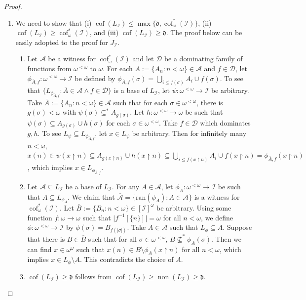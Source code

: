 \documentclass[a4paper,12pt]{amsart}
\theoremstyle{definition}
\numberwithin{thm}{section}
\numberwithin{equation}{section}
\newcommand{\fsq}{\omega^{<\omega}}
\newcommand{\on}{\mathpunct{\upharpoonright}}
\newcommand{\dd}{\mathfrak{d}}
\DeclareMathOperator{\non}{non}
\DeclareMathOperator{\cof}{cof}
\newcommand{\I}{\mathscr{I}}
\renewcommand{\subset}{\subseteq}
\begin{document}
\begin{proof}
\begin{enumerate}
        \item We need to show that (i) $\cof(L_\I)\leq\max\{\dd, \cof^*_\omega(\I)\}$, (ii) $\cof(L_\I)\geq\cof^*_\omega(\I)$, and (iii) $\cof(L_\I)\geq\dd$. The proof below can be easily adopted to the proof for $J_\I$.
        \begin{enumerate}[label = (\roman*)]
            \item Let $\mathcal{A}$ be a witness for $\cof^*_\omega(\I)$ and let $\mathcal{D}$ be a dominating family of functions from $\omega^{<\omega}$ to $\omega$. For each $\overline{A} := \{A_n:n<\omega\}\in\mathcal{A}$ and $f\in\mathcal{D}$, let $\phi_{\overline{A}, f}\colon\omega^{<\omega}\to\I$ be defined by $\phi_{\overline{A}, f}(\sigma) = \bigcup_{i\leq f(\sigma)} A_i\cup f(\sigma)$. To see that $\{L_{\phi_{\overline{A}, f}}: \overline{A}\in\mathcal{A}\land f\in\mathcal{D}\}$ is a base of $L_\I$, let $\psi\colon\fsq\to\I$ be arbitrary. Take $\overline{A} := \{A_n:n<\omega\}\in\mathcal{A}$ such that for each $\sigma\in\fsq$, there is $g(\sigma)<\omega$ with $\psi(\sigma)\subseteq^*A_{g(\sigma)}$. Let $h\colon\fsq\to\omega$ be such that $\psi(\sigma)\subseteq A_{g(\sigma)}\cup h(\sigma)$ for each $\sigma\in\fsq$. Take $f\in\mathcal{D}$ which dominates $g,h$. To see $L_{\psi}\subset L_{\phi_{\overline{A}, f}}$, let $x\in L_\psi$ be arbitrary. Then for infinitely many $n<\omega$, $x(n)\in\psi(x\on n)\subset A_{g(x\on n)}\cup h(x\on n)\subset \bigcup_{i\leq f(x\on n)} A_i\cup f(x\on n)=\phi_{\overline{A}, f}(x\on n)$, which implies $x\in L_{\phi_{\overline{A}, f}}$. 
            \item Let $\mathcal{A} \subset L_\I$ be a base of $L_\I$. For any $A\in\mathcal{A}$, let $\phi_A\colon\omega^{<\omega}\to\I$ be such that $A\subset L_{\phi_A}$. We claim that $\overline{\mathcal{A}} = \{\mathrm{ran}(\phi_A):A\in\mathcal{A}\}$ is a witness for $\cof^*_\omega(\I)$. Let $\overline{B}:=\{B_n:n<\omega\}\in[\I]^\omega$ be arbitrary. Using some function $f\colon\omega\to\omega$ such that $\lvert f^{-1}[\{n\}]\rvert=\omega$ for all $n<\omega$, we define $\phi\colon\omega^{<\omega}\to\I$ by $\phi(\sigma) = B_{f(\lvert\sigma\rvert)}$. Take $A\in\mathcal{A}$ such that $L_{\phi}\subset A$. Suppose that there is $B\in\overline{B}$ such that for all $\sigma\in\omega^{<\omega}$, $B\not\subset^*\phi_A(\sigma)$. Then we can find $x\in\omega^\omega$ such that $x(n)\in B\setminus\phi_A(x\upharpoonright n)$ for all $n<\omega$, which implies $x\in L_\phi\setminus A$. This contradicts the choice of $A$.
            \item $\cof(L_\I)\geq\dd$ follows from $\cof(L_\I)\geq\non(L_\I)\geq\dd$.
        \end{enumerate}
        \end{enumerate}
    \end{proof}
\end{document}
